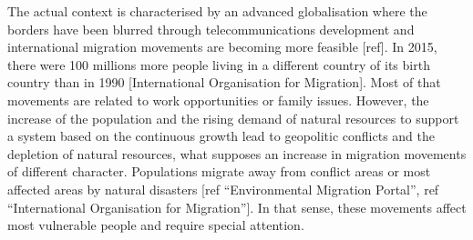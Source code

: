 
The actual context is characterised by an advanced globalisation where the borders have been blurred through telecommunications development and international migration movements are becoming more feasible [ref]. In 2015, there were 100 millions more people living in a different country of its birth country than in 1990 [International Organisation for Migration]. Most of that movements are related to work opportunities or family issues. However, the increase of the population and the rising demand of natural resources to support a system based on the continuous growth lead to geopolitic conflicts and the depletion of natural resources, what supposes an increase in migration movements of different character. Populations migrate away from conflict areas or most affected areas by natural disasters [ref ``Environmental Migration Portal'', ref ``International Organisation for Migration'']. In that sense, these movements affect most vulnerable people and require special attention.


